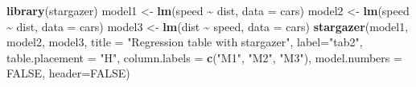 \documentclass[
  12pt,
]{article}
\newenvironment{Shaded}{\begin{snugshade}}{\end{snugshade}}
\newcommand{\AttributeTok}[1]{\textcolor[rgb]{0.13,0.29,0.53}{#1}}
\newcommand{\ConstantTok}[1]{\textcolor[rgb]{0.56,0.35,0.01}{#1}}
\newcommand{\FunctionTok}[1]{\textcolor[rgb]{0.13,0.29,0.53}{\textbf{#1}}}
\newcommand{\NormalTok}[1]{#1}
\newcommand{\OtherTok}[1]{\textcolor[rgb]{0.56,0.35,0.01}{#1}}
\newcommand{\SpecialCharTok}[1]{\textcolor[rgb]{0.81,0.36,0.00}{\textbf{#1}}}
\newcommand{\StringTok}[1]{\textcolor[rgb]{0.31,0.60,0.02}{#1}}
\begin{document}
\begin{Shaded}
\begin{Highlighting}[]
\FunctionTok{library}\NormalTok{(stargazer)}
\NormalTok{model1 }\OtherTok{\textless{}{-}} \FunctionTok{lm}\NormalTok{(speed }\SpecialCharTok{\textasciitilde{}}\NormalTok{ dist, }\AttributeTok{data =}\NormalTok{ cars)}
\NormalTok{model2 }\OtherTok{\textless{}{-}} \FunctionTok{lm}\NormalTok{(speed }\SpecialCharTok{\textasciitilde{}}\NormalTok{ dist, }\AttributeTok{data =}\NormalTok{ cars)}
\NormalTok{model3 }\OtherTok{\textless{}{-}} \FunctionTok{lm}\NormalTok{(dist }\SpecialCharTok{\textasciitilde{}}\NormalTok{ speed, }\AttributeTok{data =}\NormalTok{ cars)}
\FunctionTok{stargazer}\NormalTok{(model1, model2, model3,}
          \AttributeTok{title =} \StringTok{"Regression table with stargazer"}\NormalTok{,}
          \AttributeTok{label=}\StringTok{"tab2"}\NormalTok{, }
          \AttributeTok{table.placement =} \StringTok{"H"}\NormalTok{, }
          \AttributeTok{column.labels =} \FunctionTok{c}\NormalTok{(}\StringTok{"M1"}\NormalTok{, }\StringTok{"M2"}\NormalTok{, }\StringTok{"M3"}\NormalTok{),}
          \AttributeTok{model.numbers =} \ConstantTok{FALSE}\NormalTok{,}
          \AttributeTok{header=}\ConstantTok{FALSE}\NormalTok{)}
\end{Highlighting}
\end{Shaded}
\end{document}
